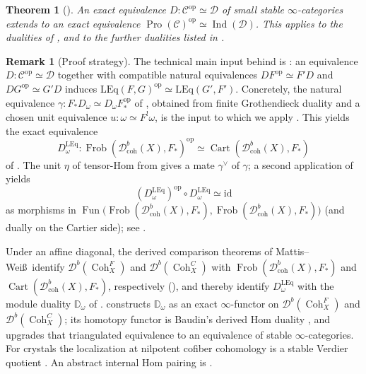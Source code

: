 \documentclass[11pt]{amsart}
\newcommand{\cC}{\mathcal{C}}
\newcommand{\cD}{\mathcal{D}}
\newcommand{\Cart}{\operatorname{Cart}}
\newcommand{\op}{{\operatorname{op}}}
\newcommand{\Coh}{\operatorname{{Coh}}}
\DeclareMathOperator{\Fun}{\mathrm{Fun}}
\newcommand{\LEq}{\mathrm{LEq}}
\newcommand{\Pro}{\operatorname{Pro}}
\newcommand{\Ind}{\operatorname{Ind}}
\newcommand{\Frob}{\operatorname{Frob}}
\newcommand{\Dbc}{\mathcal D^b_{\mathrm{coh}}}
\newcommand{\Db}{\mathcal D^b}
\theoremstyle{plain}
\newtheorem{introthm}{Theorem}
\theoremstyle{definition}
\newtheorem{remark}[remark]{Remark}
\numberwithin{equation}{section}
\begin{document}
\begin{introthm}[{}]\label{thm:intro-indpro}
An exact equivalence $D:\cC^{\op}\simeq\cD$ of small stable $\infty$-categories extends to an exact equivalence $\Pro(\cC)^{\op}\simeq\Ind(\cD)$.
This applies to the dualities of , and to the further dualities listed in .
\end{introthm}

\begin{remark}[Proof strategy]\label{rem:intro-cost}
The technical main input behind  is : an equivalence $D:\cC^{\op}\simeq\cD$ together with compatible natural equivalences $DF^{\op}\simeq F'D$ and $DG^{\op}\simeq G'D$ induces $\LEq(F,G)^{\op}\simeq\LEq(G',F')$.
Concretely, the natural equivalence $\gamma:F_*D_\omega\simeq D_\omega F_*^{\op}$ of , obtained from finite Grothendieck duality and a chosen unit equivalence $u:\omega\simeq F^!\omega$, is the input to which we apply .
This yields the exact equivalence
\[
 D_\omega^{\mathrm{LEq}}:\Frob(\Dbc(X),F_*)^{\op}\simeq\Cart(\Dbc(X),F_*)
\]
of .
The unit $\eta$ of tensor-Hom from  gives a mate $\gamma^\vee$ of $\gamma$; a second application of  yields
\[
 (D_\omega^{\mathrm{LEq}})^{\op}\circ D_\omega^{\mathrm{LEq}}
 \simeq
 \mathrm{id}
\]
as morphisms in $\Fun\bigl(\Frob(\Dbc(X),F_*),\Frob(\Dbc(X),F_*)\bigr)$ (and dually on the Cartier side); see .

Under an affine diagonal, the derived comparison theorems of Mattis--Wei\ss\ identify $\Db(\Coh^F_X)$ and $\Db(\Coh^C_X)$ with $\Frob(\Dbc(X),F_*)$ and $\Cart(\Dbc(X),F_*)$, respectively (), and thereby identify $D_\omega^{\mathrm{LEq}}$ with the module duality $\mathbb D_\omega$ of .
 constructs $\mathbb D_\omega$ as an exact $\infty$-functor on $\Db(\Coh^F_X)$ and $\Db(\Coh^C_X)$; its homotopy functor is Baudin's derived Hom duality \cite[Theorem 4.2.7]{Bau}, and  upgrades that triangulated equivalence to an equivalence of stable $\infty$-categories.
For crystals the localization at nilpotent cofiber cohomology is a stable Verdier quotient \cite[Theorem I.3.3(i)]{NS}. An abstract internal Hom pairing is .
\end{remark}
\end{document}
